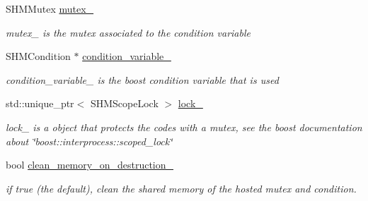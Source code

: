 \begin{DoxyCompactItemize}
\item 
S\+H\+M\+Mutex \hyperlink{classshared__memory_1_1LockedConditionVariable_a757abc2190906a0773667b42be6e4e66}{mutex\+\_\+}\hypertarget{classshared__memory_1_1LockedConditionVariable_a757abc2190906a0773667b42be6e4e66}{}\label{classshared__memory_1_1LockedConditionVariable_a757abc2190906a0773667b42be6e4e66}

\begin{DoxyCompactList}\small\item\em mutex\+\_\+ is the mutex associated to the condition variable \end{DoxyCompactList}\item 
S\+H\+M\+Condition $\ast$ \hyperlink{classshared__memory_1_1LockedConditionVariable_a8bc7fb73332304b406335e38ba4cdd1b}{condition\+\_\+variable\+\_\+}\hypertarget{classshared__memory_1_1LockedConditionVariable_a8bc7fb73332304b406335e38ba4cdd1b}{}\label{classshared__memory_1_1LockedConditionVariable_a8bc7fb73332304b406335e38ba4cdd1b}

\begin{DoxyCompactList}\small\item\em condition\+\_\+variable\+\_\+ is the boost condition variable that is used \end{DoxyCompactList}\item 
std\+::unique\+\_\+ptr$<$ S\+H\+M\+Scope\+Lock $>$ \hyperlink{classshared__memory_1_1LockedConditionVariable_a5509b431f2d459d92bfcc1b2d60651d1}{lock\+\_\+}\hypertarget{classshared__memory_1_1LockedConditionVariable_a5509b431f2d459d92bfcc1b2d60651d1}{}\label{classshared__memory_1_1LockedConditionVariable_a5509b431f2d459d92bfcc1b2d60651d1}

\begin{DoxyCompactList}\small\item\em lock\+\_\+ is a object that protects the codes with a mutex, see the boost documentation about \char`\"{}boost\+::interprocess\+::scoped\+\_\+lock\char`\"{} \end{DoxyCompactList}\item 
bool \hyperlink{classshared__memory_1_1LockedConditionVariable_abe0963bc5746d19350e816ad42ff47b1}{clean\+\_\+memory\+\_\+on\+\_\+destruction\+\_\+}\hypertarget{classshared__memory_1_1LockedConditionVariable_abe0963bc5746d19350e816ad42ff47b1}{}\label{classshared__memory_1_1LockedConditionVariable_abe0963bc5746d19350e816ad42ff47b1}

\begin{DoxyCompactList}\small\item\em if true (the default), clean the shared memory of the hosted mutex and condition. \end{DoxyCompactList}\end{DoxyCompactItemize}
